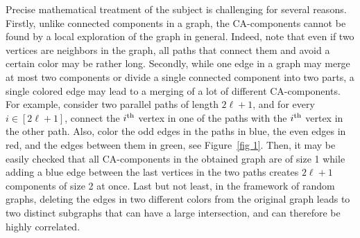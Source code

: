 \documentclass[AHL,Unicode,longabstracts,published]{cedram}
\newcommand{\rmm}[1]{\text{\normalfont #1}}
\begin{document}
Precise mathematical treatment of the subject is challenging for several reasons. Firstly, unlike connected components in a graph, the CA-components cannot be found by a local exploration of the graph in general. Indeed, note that even if two vertices are neighbors in the graph, all paths that connect them and avoid a certain color may be rather long. Secondly, while one edge in a graph may merge at most two components or divide a single connected component into two parts, a single colored edge may lead to a merging of a lot of different CA-components. For example, consider two parallel paths of length $2\ell+1$, and for every $i\in [2\ell+1]$, connect the $i^{\rmm{th}}$ vertex in one of the paths with the $i^{\rmm{th}}$ vertex in the other path. Also, color the odd edges in the paths in blue, the even edges in red, and the edges between them in green, see Figure~\ref{fig 1}. Then, it may be easily checked that all CA-components in the obtained graph are of size 1 while adding a blue edge between the last vertices in the two paths creates $2\ell+1$ components of size 2 at once. Last but not least, in the framework of random graphs, deleting the edges in two different colors from the original graph leads to two distinct subgraphs that can have a large intersection, and can therefore be highly correlated.
\end{document}
